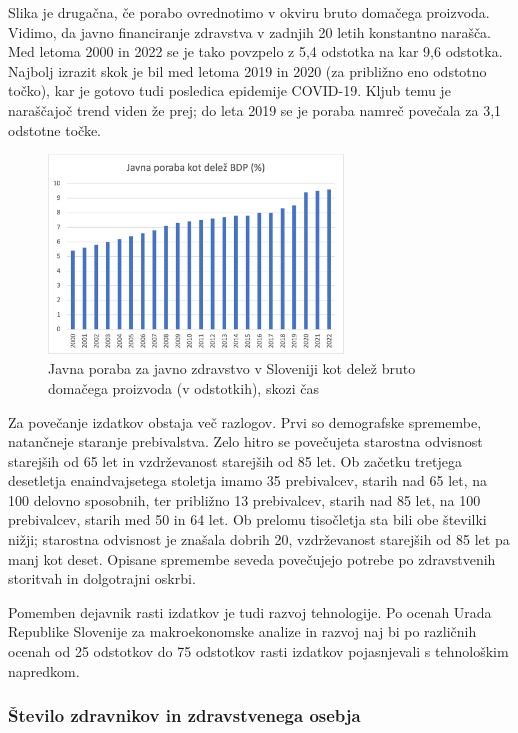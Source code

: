 \documentclass[12pt,a4paper]{article}
\theoremstyle{definition}
\begin{document}
Slika je drugačna, če porabo ovrednotimo v okviru bruto domačega proizvoda. 
Vidimo, da javno financiranje zdravstva v zadnjih 20 letih konstantno narašča. 
Med letoma 2000 in 2022 se je tako povzpelo z 5,4 odstotka na kar 9,6 odstotka. 
Najbolj izrazit skok je bil med letoma 2019 in 2020 (za približno eno odstotno točko), kar je gotovo tudi posledica epidemije COVID-19. 
Kljub temu je naraščajoč trend viden že prej; do leta 2019 se je poraba namreč povečala za 3,1 odstotne točke.

\begin{figure}[H]
    \centering
    \includegraphics[width=0.7\textwidth]{jav_por_bdp_slo.png}
    \caption{Javna poraba za javno zdravstvo v Sloveniji kot delež bruto domačega proizvoda (v odstotkih), skozi čas}
    \label{fig:jav_por_bdp_slo.png}
  \end{figure}

Za povečanje izdatkov obstaja več razlogov. Prvi so demografske spremembe, natančneje staranje prebivalstva. 
Zelo hitro se povečujeta starostna odvisnost starejših od 65 let in vzdrževanost starejših od 85 let. 
Ob začetku tretjega desetletja enaindvajsetega stoletja imamo 35 prebivalcev, starih nad 65 let, na 100 delovno sposobnih, ter približno 13 prebivalcev, starih nad 85 let, na 100 prebivalcev, starih med 50 in 64 let.
Ob prelomu tisočletja sta bili obe številki nižji; starostna odvisnost je znašala dobrih 20, vzdrževanost starejših od 85 let pa manj kot deset. \cite{Sarec2023}
Opisane spremembe seveda povečujejo potrebe po zdravstvenih storitvah in dolgotrajni oskrbi.
  
Pomemben dejavnik rasti izdatkov je tudi razvoj tehnologije. 
Po ocenah Urada Republike Slovenije za makroekonomske analize in razvoj naj bi po različnih ocenah od 25 odstotkov do 75 odstotkov rasti izdatkov pojasnjevali s tehnološkim napredkom. \cite{zdravniska_zbornica_2023}

\subsubsection{Število zdravnikov in zdravstvenega osebja}
\end{document}
